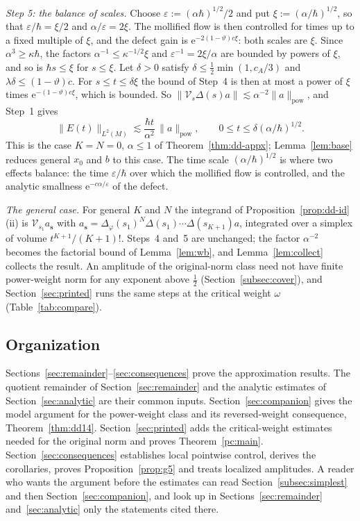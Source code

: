 \documentclass[twoside,10pt]{article}
\numberwithin{equation}{section}
\theoremstyle{slbody}
\theoremstyle{remark}
\newcommand{\norm}[1]{\lVert #1\rVert}
\newcommand{\ue}{\mathrm{e}}
\newcommand{\pwNorm}[1]{\norm{#1}_{\mathrm{pow}}}
\begin{document}
\emph{Step 5: the balance of scales.} Choose $\varepsilon:=(\alpha\hbar)^{1/2}/2$ and put $\xi:=(\alpha/\hbar)^{1/2}$, so that
$\varepsilon/\hbar=\xi/2$ and $\alpha/\varepsilon=2\xi$. The mollified flow is then controlled for times up to a fixed multiple of $\xi$,
and the defect gain is $\ue^{-2(1-\vartheta)c\xi}$: both scales are $\xi$. Since $\alpha^3\ge\kappa\hbar$, the factors $\alpha^{-1}\le\kappa^{-1/2}\xi$
and $\varepsilon^{-1}=2\xi/\alpha$ are bounded by powers of $\xi$, and so is $\hbar s\le\xi$ for $s\le\xi$. Let $\delta>0$ satisfy
$\delta\le\tfrac12\min(1,c_A/3)$ and $\lambda\delta\le(1-\vartheta)c$. For $s\le t\le\delta\xi$ the bound of Step~4 is then at most a power of
$\xi$ times $\ue^{-(1-\vartheta)c\xi}$, which is bounded. So $\norm{\mathcal V_s\Delta(s)a}\lesssim\alpha^{-2}\pwNorm a$, and Step~1 gives
\[
  \norm{E(t)}_{L^2(M)}\lesssim\frac{\hbar t}{\alpha^2}\,\pwNorm a,\qquad0\le t\le\delta(\alpha/\hbar)^{1/2}.
\]
This is the case $K=N=0$, $\alpha\le1$ of Theorem~\ref{thm:dd-appx}; Lemma~\ref{lem:base} reduces general $x_0$ and $b$ to this
case. The time scale $(\alpha/\hbar)^{1/2}$ is where two effects balance: the time $\varepsilon/\hbar$ over which the mollified flow is
controlled, and the analytic smallness $\ue^{-c\alpha/\varepsilon}$ of the defect.

\emph{The general case.} For general $K$ and $N$ the integrand of Proposition~\ref{prop:dd-id}(ii) is $\mathcal V_{s_1}a_{\mathbf s}$ with
$a_{\mathbf s}=\Delta_\varphi(s_1)^N\Delta(s_1)\cdots\Delta(s_{K+1})a$, integrated over a simplex of volume $t^{K+1}/(K+1)!$. Steps~4
and~5 are unchanged; the factor $\alpha^{-2}$ becomes the factorial bound of Lemma~\ref{lem:wb}, and Lemma~\ref{lem:collect} collects the
result. An amplitude of the original-norm class need not have finite power-weight norm for any exponent above $\tfrac12$
(Section~\ref{subsec:cover}), and Section~\ref{sec:printed} runs the same steps at the critical weight $\omega$ (Table~\ref{tab:compare}).

\subsection{Organization}
Sections~\ref{sec:remainder}--\ref{sec:consequences} prove the approximation results.
The quotient remainder of Section~\ref{sec:remainder} and the analytic estimates of Section~\ref{sec:analytic}
are their common inputs. Section~\ref{sec:companion} gives the model argument for the power-weight class and its
reversed-weight consequence, Theorem~\ref{thm:dd14}. Section~\ref{sec:printed} adds the critical-weight estimates needed for the original norm
and proves Theorem~\ref{pc:main}. Section~\ref{sec:consequences} establishes local pointwise control,
derives the corollaries, proves Proposition~\ref{prop:g5} and treats localized amplitudes. A reader who wants the argument before
the estimates can read Section~\ref{subsec:simplest} and then Section~\ref{sec:companion}, and look up in
Sections~\ref{sec:remainder} and~\ref{sec:analytic} only the statements cited there.
\end{document}
